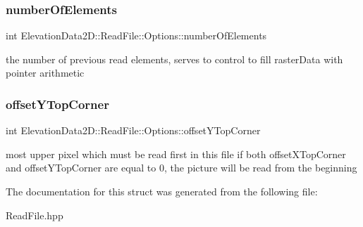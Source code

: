 \subsubsection{\texorpdfstring{number\+Of\+Elements}{numberOfElements}}
{\footnotesize\ttfamily int Elevation\+Data2\+D\+::\+Read\+File\+::\+Options\+::number\+Of\+Elements}

the number of previous read elements, serves to control to fill raster\+Data with pointer arithmetic \mbox{\label{structElevationData2D_1_1ReadFile_1_1Options_a303441c192b00be0a49a3d83d6c09200}} 
\subsubsection{\texorpdfstring{offset\+Y\+Top\+Corner}{offsetYTopCorner}}
{\footnotesize\ttfamily int Elevation\+Data2\+D\+::\+Read\+File\+::\+Options\+::offset\+Y\+Top\+Corner}

most upper pixel which must be read first in this file if both offset\+X\+Top\+Corner and offset\+Y\+Top\+Corner are equal to 0, the picture will be read from the beginning 

The documentation for this struct was generated from the following file\+:\begin{DoxyCompactItemize}
\item 
Read\+File.\+hpp\end{DoxyCompactItemize}
